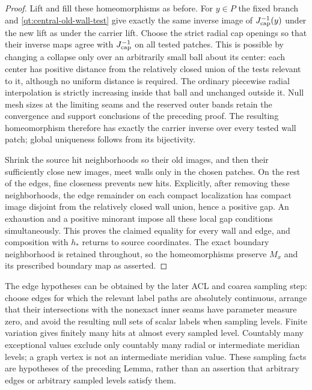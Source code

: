 \begin{proof}
Lift and fill these homeomorphisms as before.  For $y\in P$ the
fixed branch and \eqref{qt:central-old-wall-test} give exactly the
same inverse image of $J_{\rm cap}^{-1}(y)$ under the new lift as
under the carrier lift.  Choose the strict radial cap openings so
that their inverse maps agree with $J_{\rm cap}^{-1}$ on all tested
patches.  This is possible by changing a collapse only over an
arbitrarily small ball about its center: each center has positive
distance from the relatively closed union of the tests relevant
to it, although no uniform distance is required.  The ordinary
piecewise radial interpolation is strictly increasing inside that
ball and unchanged outside it.  Null mesh sizes at the limiting
seams and the reserved outer bands retain the convergence and
support conclusions of the preceding proof.  The resulting
homeomorphism therefore has exactly the carrier inverse over every
tested wall patch; global uniqueness follows from its bijectivity.

Shrink the source hit neighborhoods so their old images, and then
their sufficiently close new images, meet walls only in the chosen
patches.  On the rest of the edges, fine closeness prevents new
hits.  Explicitly, after removing these neighborhoods, the edge
remainder on each compact localization has compact image disjoint
from the relatively closed wall union, hence a positive gap.
An exhaustion and a positive minorant impose all these local gap
conditions simultaneously.  This proves the claimed equality for
every wall and edge, and composition with $h_*$ returns to source
coordinates.  The exact boundary neighborhood is retained throughout,
so the homeomorphisms preserve $M_x$ and its prescribed boundary
map as asserted.
\end{proof}

\begin{remark}
The edge hypotheses can be obtained by the later ACL and coarea
sampling step: choose edges for which the relevant label paths are
absolutely continuous, arrange that their intersections with the
nonexact inner seams have parameter measure zero, and avoid the
resulting null sets of scalar labels when sampling levels.  Finite
variation gives finitely many hits at almost every sampled level.
Countably many exceptional values exclude only countably many
radial or intermediate meridian levels; a graph vertex is not an
intermediate meridian value.  These sampling facts are hypotheses
of the preceding Lemma, rather than an assertion that arbitrary
edges or arbitrary sampled levels satisfy them.
\end{remark}
